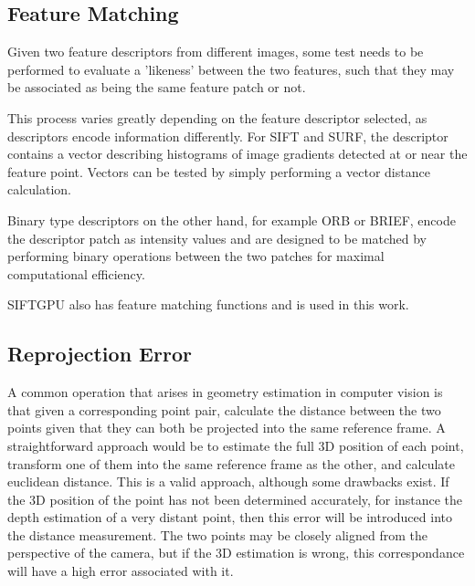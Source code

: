 
\subsection{Feature Matching}

Given two feature descriptors from different images, some test needs to be performed to evaluate a 'likeness' between the two features, such that they may be associated as being the same feature patch or not.

This process varies greatly depending on the feature descriptor selected, as descriptors encode information differently.  For SIFT and SURF, the descriptor contains a vector describing histograms of image gradients detected at or near the feature point.  Vectors can be tested by simply performing a vector distance calculation.

Binary type descriptors on the other hand, for example ORB or BRIEF, encode the descriptor patch as intensity values and are designed to be matched by performing binary operations between the two patches for maximal computational efficiency.

SIFTGPU also has feature matching functions and is used in this work.

\subsection{Reprojection Error}
\label{subsec:reprojection_error}

A common operation that arises in geometry estimation in computer vision is that given a corresponding point pair, calculate the distance between the two points given that they can both be projected into the same reference frame.  A straightforward approach would be to estimate the full 3D position of each point, transform one of them into the same reference frame as the other, and calculate euclidean distance.  This is a valid approach, although some drawbacks exist.  If the 3D position of the point has not been determined accurately, for instance the depth estimation of a very distant point, then this error will be introduced into the distance measurement.  The two points may be closely aligned from the perspective of the camera, but if the 3D estimation is wrong, this correspondance will have a high error associated with it.

